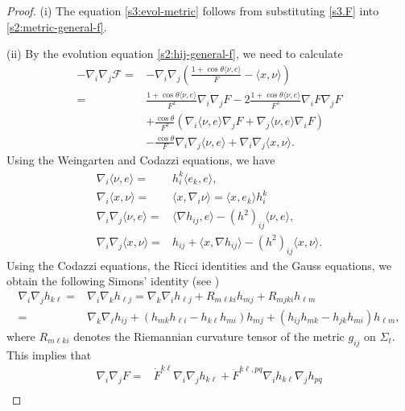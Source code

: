 \documentclass[11pt,reqno]{amsart}
\theoremstyle{definition}
\theoremstyle{remark}
\numberwithin{equation}{section}
\renewcommand{\(}{\left(}
\renewcommand{\)}{\right)}
\renewcommand{\-}{\overline}
\renewcommand{\t}{\theta}
\begin{document}
\begin{proof}
	(i) The  equation \eqref{s3:evol-metric} follows from substituting \eqref{s3.F} into \eqref{s2:metric-general-f}.
	
	(ii) By the evolution equation \eqref{s2:hij-general-f}, we need to calculate
\begin{align*}
 -\nabla_i \nabla_j\mathcal{F}=& -\nabla_i \nabla_j\(\frac{1+\cos\t\langle \nu,e\rangle}{F}-\langle x,\nu\rangle\) \\
  = & \frac{1+\cos\t\langle \nu,e\rangle}{F^2}\nabla_i \nabla_jF-2\frac{1+\cos\t\langle \nu,e\rangle}{F^3}\nabla_iF \nabla_jF\\
  &+\frac{\cos\theta}{F^2}\left(\nabla_i\langle\nu,e\rangle \nabla_jF+\nabla_j\langle\nu,e\rangle \nabla_iF\right)\\
  &-\frac{\cos\theta}{F}\nabla_i \nabla_j\langle\nu,e\rangle+\nabla_i \nabla_j\langle x,\nu\rangle.
\end{align*}
Using the Weingarten and Codazzi equations, we have
\begin{align}
  \nabla_i\langle \nu,e\rangle= & h_i^k\langle e_k,e\rangle, \label{s3.dnue}\\
  \nabla_i\langle x,\nu\rangle =&\langle x,\nabla_i\nu\rangle=\langle x,e_k\rangle h_i^k\label{s3.du}\\
   \nabla_i\nabla_j\langle \nu,e\rangle= & \langle \nabla h_{ij},e\rangle -(h^2)_{ij}\langle \nu,e\rangle,\label{s3.d2nue} \\
   \nabla_i\nabla_j\langle x,\nu\rangle= & h_{ij}+\langle x, \nabla h_{ij}\rangle -(h^2)_{ij}\langle x,\nu\rangle.\label{s3.d2u}
\end{align}
Using the Codazzi equations, the Ricci identities and the Gauss equations, we obtain the following Simons' identity (see \cite{CM2011})
	\begin{align*}%
	\nabla_i\nabla_j h_{k\ell}=&\nabla_i\nabla_k h_{\ell j}
	=\nabla_k\nabla_i h_{\ell j}+R_{m\ell ki}h_{mj}+R_{mjki}h_{\ell m} \nonumber\\
	=&\nabla_k\nabla_\ell h_{ij}+(h_{mk}h_{\ell i}-h_{k\ell}h_{mi})h_{mj}+(h_{ij}h_{mk}-h_{jk}h_{mi})h_{\ell m},
	\end{align*}
where $R_{m\ell ki}$ denotes the Riemannian curvature tensor of the metric $g_{ij}$ on $\Sigma_t$. This implies that
	\begin{align*}%
	\nabla_i\nabla_j F=&\dot{F}^{k\ell}\nabla_i\nabla_j h_{k\ell}+\ddot{F}^{k\ell,pq}\nabla_i h_{k\ell}\nabla_j h_{pq} \nonumber\\

\end{align*}
\end{proof}
\end{document}
